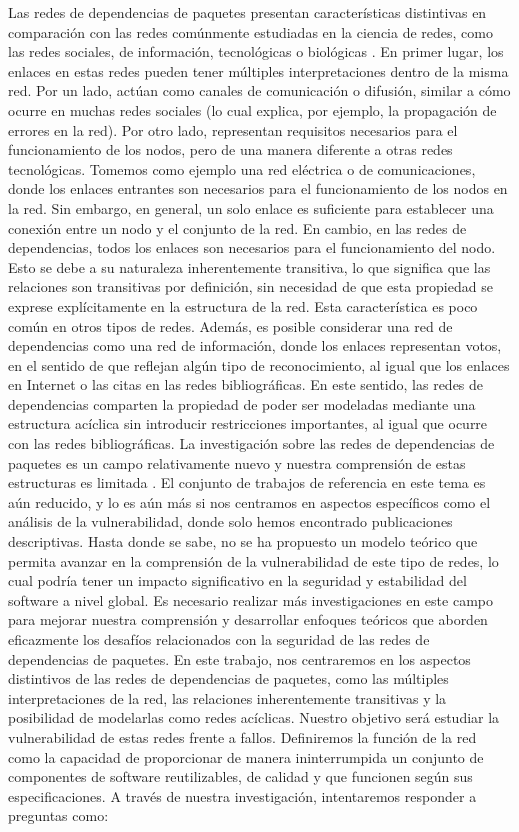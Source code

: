 Las redes de dependencias de paquetes presentan características distintivas en comparación con las redes comúnmente estudiadas en la ciencia de redes,
como las redes sociales, de información, tecnológicas o biológicas \cite{doi:10.1137/S003614450342480}.
En primer lugar, los enlaces en estas redes pueden tener múltiples interpretaciones dentro de la misma red.
Por un lado, actúan como canales de comunicación o difusión, similar a cómo ocurre en muchas redes sociales (lo cual explica, por ejemplo,
la propagación de errores en la red). Por otro lado, representan requisitos necesarios para el funcionamiento de los nodos, pero de una manera
diferente a otras redes tecnológicas.
Tomemos como ejemplo una red eléctrica o de comunicaciones, donde los enlaces entrantes son necesarios para el funcionamiento de los nodos en la red.
Sin embargo, en general, un solo enlace es suficiente para establecer una conexión entre un nodo y el conjunto de la red.
En cambio, en las redes de dependencias, todos los enlaces son necesarios para el funcionamiento del nodo.
Esto se debe a su naturaleza inherentemente transitiva, lo que significa que las relaciones son transitivas por definición, sin necesidad de
que esta propiedad se exprese explícitamente en la estructura de la red. Esta característica es poco común en otros tipos de redes.
Además, es posible considerar una red de dependencias como una red de información, donde los enlaces representan votos, en el sentido de
que reflejan algún tipo de reconocimiento, al igual que los enlaces en Internet o las citas en las redes bibliográficas. En este sentido,
las redes de dependencias comparten la propiedad de poder ser modeladas mediante una estructura acíclica sin introducir restricciones importantes,
al igual que ocurre con las redes bibliográficas.
La investigación sobre las redes de dependencias de paquetes es un campo relativamente nuevo y nuestra comprensión de estas estructuras es limitada \cite{7962360}. El conjunto de trabajos de referencia en este tema es aún reducido, y lo es aún más si nos centramos en aspectos específicos como el análisis de la vulnerabilidad, donde solo hemos encontrado publicaciones descriptivas. Hasta donde se sabe, no se ha propuesto un modelo teórico que permita avanzar en la comprensión de la vulnerabilidad de este tipo de redes, lo cual podría tener un impacto significativo en la seguridad y estabilidad del software a nivel global. Es necesario realizar más investigaciones en este campo para mejorar nuestra comprensión y desarrollar enfoques teóricos que aborden eficazmente los desafíos relacionados con la seguridad de las redes de dependencias de paquetes.
En este trabajo, nos centraremos en los aspectos distintivos de las redes de dependencias de paquetes, como las múltiples interpretaciones de la red, las relaciones inherentemente transitivas y la posibilidad de modelarlas como redes acíclicas. Nuestro objetivo será estudiar la vulnerabilidad de estas redes frente a fallos. Definiremos la función de la red como la capacidad de proporcionar de manera ininterrumpida un conjunto de componentes de software reutilizables, de calidad y que funcionen según sus especificaciones. A través de nuestra investigación, intentaremos responder a preguntas como:

